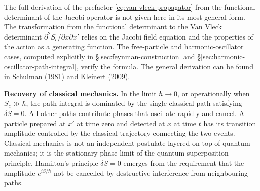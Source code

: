 \begin{note}
The full derivation of the prefactor \eqref{eq:van-vleck-propagator} from the functional determinant of the Jacobi operator is not given here in its most general form. The transformation from the functional determinant to the Van Vleck determinant $\partial^2 S_c/\partial x \partial x'$ relies on the Jacobi field equation and the properties of the action as a generating function. The free-particle and harmonic-oscillator cases, computed explicitly in \S\ref{sec:feynman-construction} and \S\ref{sec:harmonic-oscillator-path-integral}, verify the formula. The general derivation can be found in Schulman (1981) and Kleinert (2009).
\end{note}

\medskip\noindent\textbf{Recovery of classical mechanics.}
In the limit $\hbar \to 0$, or operationally when $S_c \gg \hbar$, the path integral is dominated by the single classical path satisfying $\delta S = 0$. All other paths contribute phases that oscillate rapidly and cancel. A particle prepared at $x'$ at time zero and detected at $x$ at time $t$ has its transition amplitude controlled by the classical trajectory connecting the two events. Classical mechanics is not an independent postulate layered on top of quantum mechanics; it is the stationary-phase limit of the quantum superposition principle. Hamilton's principle $\delta S = 0$ emerges from the requirement that the amplitude $e^{iS/\hbar}$ not be cancelled by destructive interference from neighbouring paths.

